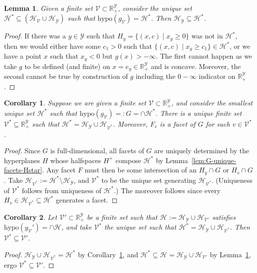 \documentclass[11pt]{article}
\newcommand{\Comments}{1}
\newcommand{\mynote}[2]{\ifnum\Comments=1\textcolor{#1}{#2}\fi}
\newcommand{\raf}[1]{\mynote{darkgreen}{[RF: #1]}}
\newcommand{\reals}{\mathbb{R}}
\renewcommand{\H}{\mathcal{H}}
\newcommand{\V}{\mathcal{V}}
\newcommand{\Y}{\mathcal{Y}}
\newcommand{\hyp}{\mathrm{hypo}}
\newtheorem{lemma}{Lemma}
\newtheorem{corollary}{Corollary}
\begin{document}
\begin{lemma}\label{lem:HY-subset-Hstar}
  Given a finite set $\V \subset \reals^\Y_+$, consider the unique set $\H^* \subseteq (\H_\V \cup \H_\Y)$ such that $\hyp(g_\V) = \H^*$.
  Then $\H_\Y \subseteq \H^*$.
\end{lemma}
\begin{proof}
  If there was a $y \in \Y$ such that $H_y = \{(x,c) \mid x_y \geq 0\}$ was not in $\H^*$, then we would either have some $c_1 > 0$ such that $\{(x,c) \mid x_y \geq c_1\} \in \H^*$, or we have a point $x$ such that $x_y < 0$ but $g(x) > -\infty$.
  The first cannot happen as we take $g$ to be defined (and finite) on $x = e_y \in \reals^\Y_+$ and is concave.
  Moreover, the second cannot be true by construction of $g$ including the $0-\infty$ indicator on $\reals^\Y_+$.	
\end{proof}

\begin{corollary}\label{cor:unique-set-loss-vectors-defining-facets}
  Suppose we are given a finite set $\V \subset \reals^\Y_+$, and consider the smallest unique set $\H^*$ such that $\hyp(g_\V) =: G = \cap \H^*$.
  There is a unique finite set $\V^* \subseteq \reals^\Y_+$ such that $\H^* = \H_\Y \cup \H_{\V^*}$.
  Moreover, $F_v$ is a facet of $G$ for each $v\in\V^*$.
\end{corollary}
\begin{proof}
%
  Since $G$ is full-dimensional, all facets of $G$ are uniquely determined by the hyperplanes $H$ whose halfspaces $H^+$ compose $\H^*$ by Lemma~\ref{lem:G-unique-facets-Hstar}.
  Any facet $F$ must then be some intersection of an $H_y \cap G$ or $H_v \cap G$.
  Take $\H_{\V^*} := \H^* \setminus \H_{\Y}$, and $\V^*$ to be the unique set generating $\H_{\V^*}$.
  (Uniqueness of $\V^*$ follows from uniqueness of $\H^*$.)
  The moreover follows since every $H_v \in \H_{\V^*} \subseteq \H^*$ generates a facet.

\end{proof}



\begin{corollary}\label{cor:anything-gen-G-subset-Hstar}
  Let $\V' \subset \reals^\Y_+$ be a finite set such that $\H := \H_\Y \cup \H_{\V'}$ satisfies $\hyp(g_\V') = \cap \H$, and take $\V^*$ the unique set such that $\H^* = \H_\Y \cup \H_{\V^*}$.  
  Then $\V^* \subseteq \V'$.
\end{corollary}
\begin{proof}
  $\H_\Y \cup \H_{\V^*} = \H^*$ by Corollary~\ref{cor:unique-set-loss-vectors-defining-facets}, and $\H^* \subseteq \H = \H_\Y \cup \H_{\V'}$ by Lemma~\ref{lem:HY-subset-Hstar}, ergo $\V^* \subseteq \V'$.
\end{proof}
\end{document}
